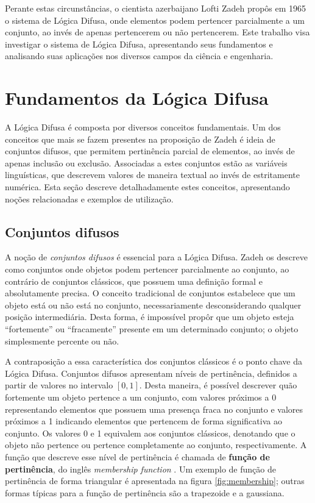 \documentclass[12pt]{article}
\begin{document}
Perante estas circunstâncias, o cientista azerbaijano Lofti Zadeh propôs em 1965 o sistema de Lógica Difusa, onde elementos podem pertencer parcialmente a um conjunto, ao invés de apenas pertencerem ou não pertencerem. Este trabalho visa investigar o sistema de Lógica Difusa, apresentando seus fundamentos e analisando suas aplicações nos diversos campos da ciência e engenharia.

\section{Fundamentos da Lógica Difusa} \label{sec:fundaments}

A Lógica Difusa é composta por diversos conceitos fundamentais. Um dos conceitos que mais se fazem presentes na proposição de Zadeh é ideia de conjuntos difusos, que permitem pertinência parcial de elementos, ao invés de apenas inclusão ou exclusão. Associadas a estes conjuntos estão as variáveis linguísticas, que descrevem valores de maneira textual ao invés de estritamente numérica. Esta seção descreve detalhadamente estes conceitos, apresentando noções relacionadas e exemplos de utilização.

\subsection{Conjuntos difusos}

A noção de \textit{conjuntos difusos} é essencial para a Lógica Difusa. Zadeh os descreve como conjuntos onde objetos podem pertencer parcialmente ao conjunto, ao contrário de conjuntos clássicos, que possuem uma definição formal e absolutamente precisa. O conceito tradicional de conjuntos estabelece que um objeto está ou não está no conjunto, necessariamente desconsiderando qualquer posição intermediária. Desta forma, é impossível propôr que um objeto esteja ``fortemente'' ou ``fracamente'' presente em um determinado conjunto; o objeto simplesmente percente ou não.

A contraposição a essa característica dos conjuntos clássicos é o ponto chave da Lógica Difusa. Conjuntos difusos apresentam níveis de pertinência, definidos a partir de valores no intervalo $[0, 1]$. Desta maneira, é possível descrever quão fortemente um objeto pertence a um conjunto, com valores próximos a 0 representando elementos que possuem uma presença fraca no conjunto e valores próximos a 1 indicando elementos que pertencem de forma significativa ao conjunto. Os valores 0 e 1 equivalem aos conjuntos clássicos, denotando que o objeto não pertence ou pertence completamente ao conjunto, respectivamente. A função que descreve esse nível de pertinência é chamada de \textbf{função de pertinência}, do inglês \textit{membership function} \cite{Zadeh1965}. Um exemplo de função de pertinência de forma triangular é apresentada na figura \ref{fig:membership}; outras formas típicas para a função de pertinência são a trapezoide e a gaussiana.
\end{document}
